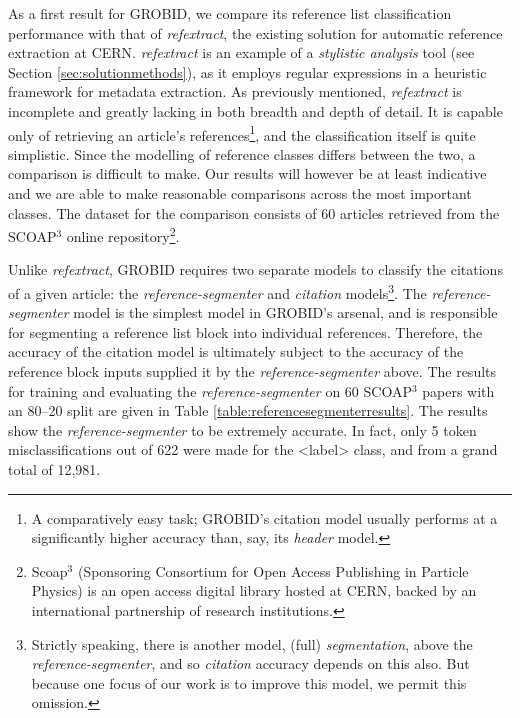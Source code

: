 As a first result for GROBID, we compare its reference list classification performance with that of \emph{refextract}, the existing solution for automatic reference extraction at CERN. \emph{refextract} is an example of a \emph{stylistic analysis} tool (see Section \ref{sec:solutionmethods}), as it employs regular expressions in a heuristic framework for metadata extraction. As previously mentioned, \emph{refextract} is incomplete and greatly lacking in both breadth and depth of detail. It is capable only of retrieving an article's references\footnote{A comparatively easy task; GROBID's citation model usually performs at a significantly higher accuracy than, say, its \emph{header} model.}, and the classification itself is quite simplistic. Since the modelling of reference classes differs between the two, a comparison is difficult to make. Our results will however be at least indicative and we are able to make reasonable comparisons across the most important classes. The dataset for the comparison consists of 60 articles retrieved from the SCOAP$^3$ online repository\footnote{Scoap$^3$ (Sponsoring Consortium for Open Access Publishing in Particle Physics) is an open access digital library hosted at CERN, backed by an international partnership of research institutions.}.

Unlike \emph{refextract}, GROBID requires two separate models to classify the citations of a given article: the \emph{reference-segmenter} and \emph{citation} models\footnote{Strictly speaking, there is another model, (full) \emph{segmentation}, above the \emph{reference-segmenter}, and so \emph{citation} accuracy depends on this also. But because one focus of our work is to improve this model, we permit this omission.}. The \emph{reference-segmenter} model is the simplest model in GROBID's arsenal, and is responsible for segmenting a reference list block into individual references. Therefore, the accuracy of the citation model is ultimately subject to the accuracy of the reference block inputs supplied it by the \emph{reference-segmenter} above. The results for training and evaluating the \emph{reference-segmenter} on 60 SCOAP$^3$ papers with an 80--20 split are given in Table \ref{table:referencesegmenterresults}. The results show the \emph{reference-segmenter} to be extremely accurate. In fact, only 5 token misclassifications out of 622 were made for the <label> class, and from a grand total of 12,981.

